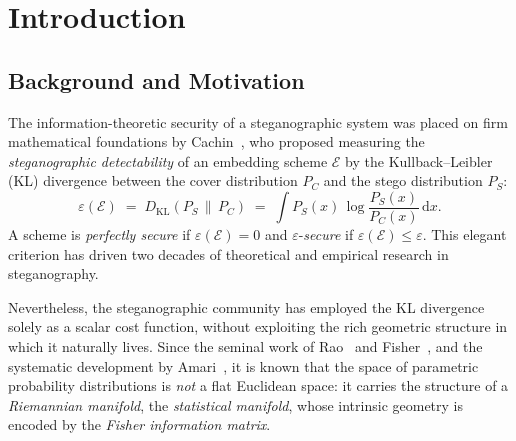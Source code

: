 \documentclass[a4paper,fleqn]{cas-dc}
\newcommand{\DKL}{D_{\mathrm{KL}}}
\begin{document}
\maketitle


\section{Introduction}
\label{sec:intro}

\subsection{Background and Motivation}

The information-theoretic security of a steganographic system was placed on
firm mathematical foundations by Cachin~\cite{cachin1998information}, who
proposed measuring the \emph{steganographic detectability} of an embedding
scheme $\mathcal{E}$ by the Kullback--Leibler (KL) divergence between the
cover distribution $P_C$ and the stego distribution $P_S$:
\begin{equation}
  \varepsilon(\mathcal{E}) \;=\; \DKL\!\left(P_S \,\|\, P_C\right)
  \;=\; \int P_S(x)\,\log\frac{P_S(x)}{P_C(x)}\,\mathrm{d}x.
  \label{eq:cachin_security}
\end{equation}
A scheme is \emph{perfectly secure} if $\varepsilon(\mathcal{E})=0$ and
$\varepsilon$-\emph{secure} if $\varepsilon(\mathcal{E})\leq\varepsilon$.
This elegant criterion has driven two decades of theoretical and empirical
research in steganography.

Nevertheless, the steganographic community has employed the KL divergence
solely as a scalar cost function, without exploiting the rich geometric
structure in which it naturally lives.
Since the seminal work of Rao~\cite{rao1945information} and
Fisher~\cite{fisher1925theory}, and the systematic development by
Amari~\cite{amari1985differential,amari2000methods}, it is known that
the space of parametric probability distributions is
\emph{not} a flat Euclidean space: it carries the structure of a
\emph{Riemannian manifold}, the \emph{statistical manifold}, whose intrinsic
geometry is encoded by the \emph{Fisher information matrix}.
\end{document}
